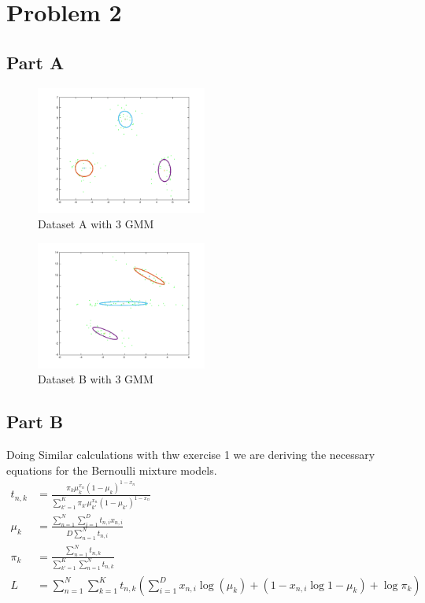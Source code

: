 \section*{Problem 2}
\subsection*{Part A}
\begin{figure}[ht]
    \centering
  \vspace{-20pt}
    \includegraphics[width=0.5\textwidth]{figures/mixmodelA_3_20.png}
    \caption{Dataset A with 3 GMM}
    \vspace{4ex}
\end{figure}

\begin{figure}[ht]
    \centering
    \includegraphics[width=0.5\textwidth]{figures/mixmodelB_3_20.png}
    \caption{Dataset B with 3 GMM}
    \vspace{4ex}
\end{figure}

\subsection*{Part B}
Doing Similar calculations with thw exercise 1 we are deriving the necessary
equations for the Bernoulli mixture models.
\begin{align*}
t_{n,k} &= \frac{\pi_{k}\mu_{k}^{x_{n}} (1-\mu_{k})^{1-x_{n}}}{\sum_{k'=1}^K \pi_{k'} \mu_{k'}^{x_{n}}(1-\mu_{k'})^{1-x_n}}\\
\mu_{k} &= \frac{\sum_{n=1}^N\sum_{i=1}^{D} t_{n,i}x_{n,i}}{D\sum_{n=1}^N t_{n,i}}\\
\pi_{k} &= \frac{\sum_{n=1}^{N}t_{n,k}}{\sum_{k'=1}^K\sum_{n=1}^{N}t_{n,k}}\\
L &= \sum_{n=1}^{N}\sum_{k=1}^{K}t_{n,k}(\sum_{i=1}^{D}x_{n,i}\log(\mu_{k})+(1-x_{n,i}\log{1-\mu_{k}}) + \log\pi_{k})
\end{align*}
